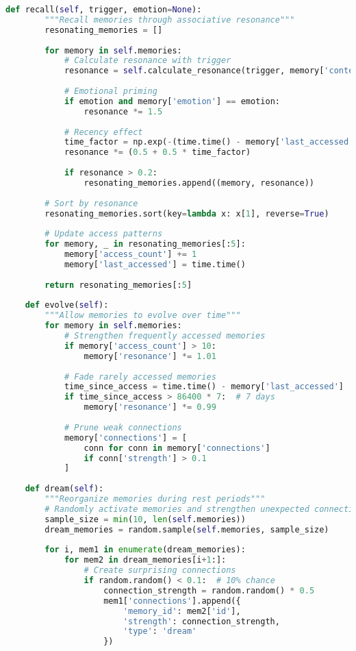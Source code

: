 \documentclass[12pt,a4paper]{article}
\begin{document}
\begin{lstlisting}[language=Python, caption=Memory Palace Implementation]
    def recall(self, trigger, emotion=None):
        """Recall memories through associative resonance"""
        resonating_memories = []
        
        for memory in self.memories:
            # Calculate resonance with trigger
            resonance = self.calculate_resonance(trigger, memory['content'])
            
            # Emotional priming
            if emotion and memory['emotion'] == emotion:
                resonance *= 1.5
            
            # Recency effect
            time_factor = np.exp(-(time.time() - memory['last_accessed']) / 86400)
            resonance *= (0.5 + 0.5 * time_factor)
            
            if resonance > 0.2:
                resonating_memories.append((memory, resonance))
                
        # Sort by resonance
        resonating_memories.sort(key=lambda x: x[1], reverse=True)
        
        # Update access patterns
        for memory, _ in resonating_memories[:5]:
            memory['access_count'] += 1
            memory['last_accessed'] = time.time()
            
        return resonating_memories[:5]
        
    def evolve(self):
        """Allow memories to evolve over time"""
        for memory in self.memories:
            # Strengthen frequently accessed memories
            if memory['access_count'] > 10:
                memory['resonance'] *= 1.01
                
            # Fade rarely accessed memories
            time_since_access = time.time() - memory['last_accessed']
            if time_since_access > 86400 * 7:  # 7 days
                memory['resonance'] *= 0.99
                
            # Prune weak connections
            memory['connections'] = [
                conn for conn in memory['connections']
                if conn['strength'] > 0.1
            ]
            
    def dream(self):
        """Reorganize memories during rest periods"""
        # Randomly activate memories and strengthen unexpected connections
        sample_size = min(10, len(self.memories))
        dream_memories = random.sample(self.memories, sample_size)
        
        for i, mem1 in enumerate(dream_memories):
            for mem2 in dream_memories[i+1:]:
                # Create surprising connections
                if random.random() < 0.1:  # 10% chance
                    connection_strength = random.random() * 0.5
                    mem1['connections'].append({
                        'memory_id': mem2['id'],
                        'strength': connection_strength,
                        'type': 'dream'
                    })
\end{lstlisting}
\end{document}
